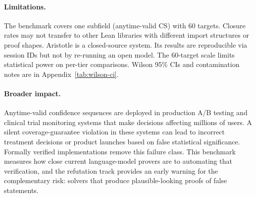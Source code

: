 \paragraph{Limitations.}
The benchmark covers one subfield (anytime-valid CS) with $60$
targets. Closure rates may not transfer to other Lean libraries
with different import structures or proof shapes. Aristotle is a
closed-source system. Its results are reproducible via session IDs
but not by re-running an open model. The $60$-target scale limits
statistical power on per-tier comparisons. Wilson 95\% CIs
and contamination notes are in Appendix~\ref{tab:wilson-ci}.

\paragraph{Broader impact.}
Anytime-valid confidence sequences are deployed in production A/B
testing and clinical trial monitoring systems that make decisions
affecting millions of users. A silent coverage-guarantee violation
in these systems can lead to incorrect treatment decisions or
product launches based on false statistical significance. Formally
verified implementations remove this failure class. This benchmark
measures how close current language-model provers are to automating
that verification, and the refutation track provides an early
warning for the complementary risk: solvers that produce
plausible-looking proofs of false statements.
